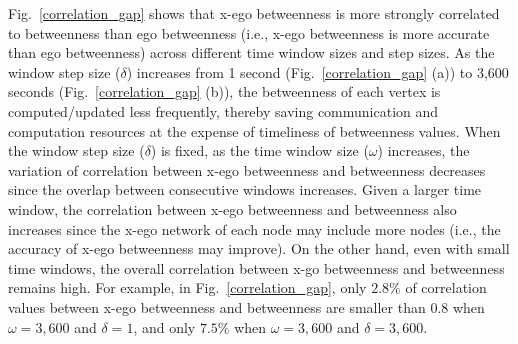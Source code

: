 Fig.~\ref{correlation_gap} shows that x-ego betweenness is more strongly correlated to betweenness than ego betweenness (i.e., x-ego betweenness is more accurate than ego betweenness) across different time window sizes and step sizes.
As the window step size ($\delta$) increases from 1 second (Fig.~\ref{correlation_gap} (a)) to 3,600 seconds (Fig.~\ref{correlation_gap} (b)), the betweenness of each vertex is computed/updated less frequently, thereby saving communication and computation resources at the expense of timeliness of betweenness values. 
When the window step size ($\delta$) is fixed, as the time window size ($\omega$) increases, the variation of correlation between x-ego betweenness and betweenness decreases since the overlap between consecutive windows increases.
Given a larger time window, the correlation between x-ego betweenness and betweenness also increases since the x-ego network of each node may include more nodes (i.e., the accuracy of x-ego betweenness may improve).
On the other hand, even with small time windows, the overall correlation between x-go betweenness and betweenness remains high. 
For example, in Fig.~\ref{correlation_gap}, only $2.8\%$ of correlation values between x-ego betweenness and betweenness are smaller than 0.8 when $\omega=3{,}600$ and $\delta=1$, and only $7.5\%$ when $\omega=3{,}600$ and $\delta=3{,}600$. 

